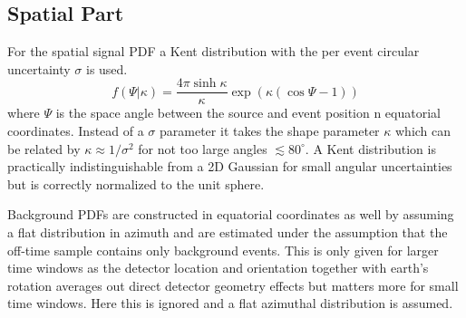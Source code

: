 \subsection{Spatial Part}
For the spatial signal PDF a Kent distribution with the per event circular uncertainty $\sigma$ is used.
\begin{equation}
  f(\Psi | \kappa) = \frac{4\pi\sinh\kappa}{\kappa}
    \exp\left(\kappa (\cos\Psi - 1)\right)
\end{equation}
where $\Psi$ is the space angle between the source and event position n equatorial coordinates.
Instead of a $\sigma$ parameter it takes the shape parameter $\kappa$ which can be related by $\kappa \approx 1 / \sigma^2$ for not too large angles $\lesssim 80^\circ$.
A Kent distribution is practically indistinguishable from a 2D Gaussian for small angular uncertainties but is correctly normalized to the unit sphere.

Background PDFs are constructed in equatorial coordinates as well by assuming a flat distribution in azimuth and are estimated under the assumption that the off-time sample contains only background events.
This is only given for larger time windows as the detector location and orientation together with earth's rotation averages out direct detector geometry effects but matters more for small time windows.
Here this is ignored and a flat azimuthal distribution is assumed.


